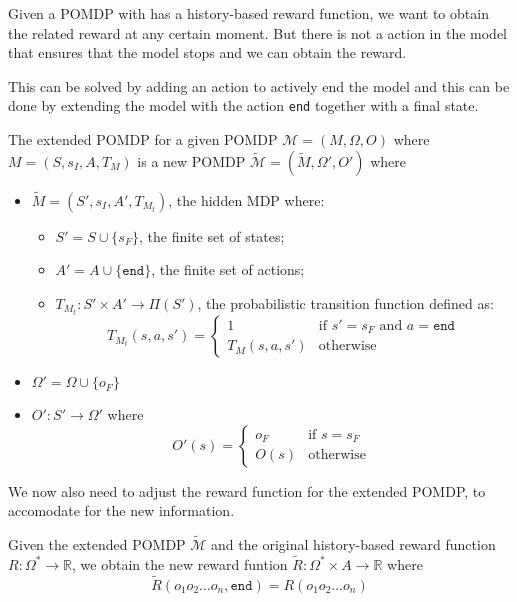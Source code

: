 Given a POMDP with has a history-based reward function, we want to obtain the related reward at any certain moment. But there is not a action in the model that ensures that the model stops and we can obtain the reward. 

This can be solved by adding an action to actively end the model and this can be done by extending the model with the action \texttt{end} together with a final state.

\begin{definition}
	The extended POMDP for a given POMDP $\mathcal{M}=(M,\Omega,O)$ where $M=(S,s_I,A,T_{M})$ is a new POMDP $\widetilde{\mathcal{M}} = (\widetilde{M},\Omega',O')$ where
		\begin{itemize}
		\item $\widetilde{M} = (S',s_I,A',T_{M_t})$, the hidden MDP where:
		\begin{itemize}
			\item $S'=S\cup \{s_F\}$, the finite set of states;
			\item $A'=A\cup \{\texttt{end}\}$, the finite set of actions;
			\item $T_{M_t}:S'\times A' \to \Pi(S')$, the probabilistic transition function defined as:
			\[ T_{M_t}(s,a,s') = \begin{cases}
						1 & \text{if } s'=s_F \text{ and } a = \texttt{end}\\
						T_M(s,a,s') & \text{otherwise} 
					\end{cases} \]
		\end{itemize}
	\item $\Omega'= \Omega\cup \{o_F\}$
	\item $O' : S' \to \Omega'$ where 
		\[ O'(s) = \begin{cases}
			o_F & \text{if } s=s_F \\
			O(s) & \text{otherwise} 
			\end{cases} \]
	\end{itemize}
	\label{d:extended_pomdp}
\end{definition}

We now also need to adjust the reward function for the extended POMDP, to accomodate for the new information.
\begin{definition}
	\label{def:reward-mdp}
	Given the extended POMDP $\widetilde{\mathcal{M}}$ and the original history-based reward function $R:\Omega^*\to \mathbb{R}$, we obtain the new reward funtion $\widetilde{R}:\Omega^*\times A\to\mathbb{R}$  where 
	\[\widetilde{R}(o_1 o_2\dots o_n,\texttt{end}) = 
		R(o_1 o_2 \dots o_{n})\]
\end{definition}
